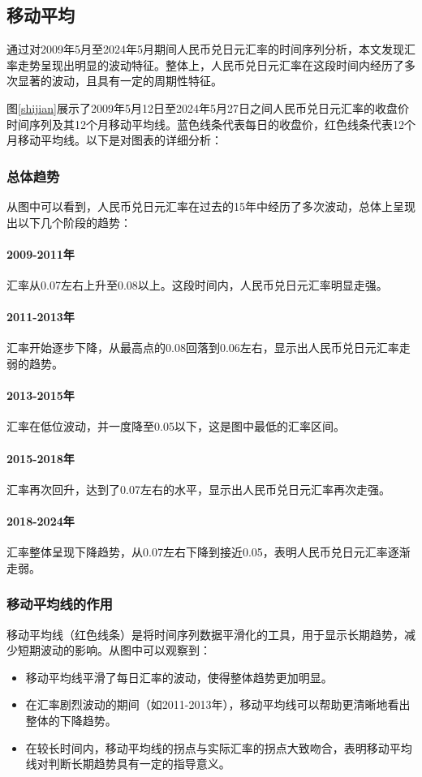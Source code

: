 \subsection{移动平均}
通过对2009年5月至2024年5月期间人民币兑日元汇率的时间序列分析，本文发现汇率走势呈现出明显的波动特征。整体上，人民币兑日元汇率在这段时间内经历了多次显著的波动，且具有一定的周期性特征。

图\ref{shijian}展示了2009年5月12日至2024年5月27日之间人民币兑日元汇率的收盘价时间序列及其12个月移动平均线。蓝色线条代表每日的收盘价，红色线条代表12个月移动平均线。以下是对图表的详细分析：

\subsubsection{总体趋势}
从图中可以看到，人民币兑日元汇率在过去的15年中经历了多次波动，总体上呈现出以下几个阶段的趋势：
\paragraph{2009-2011年}汇率从0.07左右上升至0.08以上。这段时间内，人民币兑日元汇率明显走强。
\paragraph{2011-2013年}汇率开始逐步下降，从最高点的0.08回落到0.06左右，显示出人民币兑日元汇率走弱的趋势。
\paragraph{2013-2015年}汇率在低位波动，并一度降至0.05以下，这是图中最低的汇率区间。
\paragraph{2015-2018年}汇率再次回升，达到了0.07左右的水平，显示出人民币兑日元汇率再次走强。
\paragraph{2018-2024年}汇率整体呈现下降趋势，从0.07左右下降到接近0.05，表明人民币兑日元汇率逐渐走弱。

\subsubsection{移动平均线的作用}
移动平均线（红色线条）是将时间序列数据平滑化的工具，用于显示长期趋势，减少短期波动的影响。从图中可以观察到：
\begin{itemize}
  \item 移动平均线平滑了每日汇率的波动，使得整体趋势更加明显。
  \item 在汇率剧烈波动的期间（如2011-2013年），移动平均线可以帮助更清晰地看出整体的下降趋势。
  \item 在较长时间内，移动平均线的拐点与实际汇率的拐点大致吻合，表明移动平均线对判断长期趋势具有一定的指导意义。
\end{itemize}

